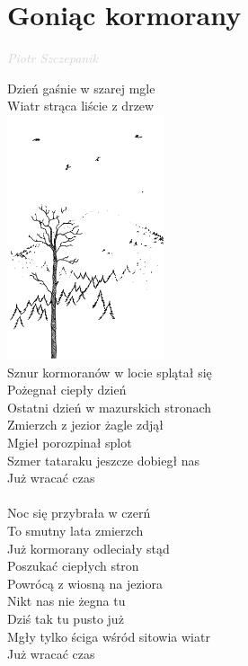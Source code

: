 \documentclass[a5paper, 10pt]{book}
\begin{document}
\section{Goniąc kormorany}\textcolor{lightgray}{\textit{Piotr Szczepanik}}\vspace*{2mm}\\
\begin{minipage}[t]{0.78\textwidth}
  Dzień gaśnie w szarej mgle\\
  Wiatr strąca liście z drzew\\
  \includegraphics[height=72mm,right]{images/goniac_kormorany.png}\vspace*{-73mm}\\
  Sznur kormoranów w locie splątał się\\
  Pożegnał ciepły dzień\\
  Ostatni dzień w mazurskich stronach\\
  \hspace*{5mm}Zmierzch z jezior żagle zdjął\\
  \hspace*{5mm}Mgieł porozpinał splot\\
  \hspace*{5mm}Szmer tataraku jeszcze dobiegł nas\\
  \hspace*{5mm}Już wracać czas\\
  \\
  Noc się przybrała w czerń\\
  To smutny lata zmierzch\\
  Już kormorany odleciały stąd\\
  Poszukać ciepłych stron\\
  Powrócą z wiosną na jeziora\\
  \hspace*{5mm}Nikt nas nie żegna tu\\
  \hspace*{5mm}Dziś tak tu pusto już\\
  \hspace*{5mm}Mgły tylko ściga wśród sitowia wiatr\\
  \hspace*{5mm}Już wracać czas\\
\end{minipage}
\end{document}
